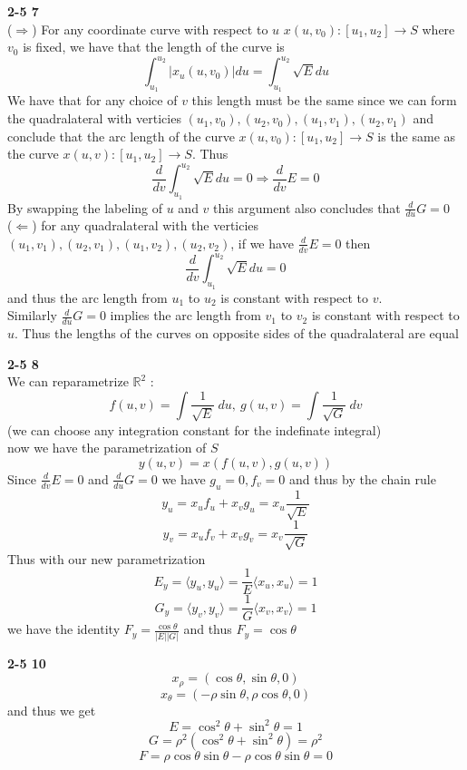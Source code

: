\documentclass[12pt]{article}
\newenvironment{ques}[1]{\textbf{#1}\vspace{1 mm}\\ }{\bigskip}
\theoremstyle{definition}
\renewcommand{\l}{\left }
\renewcommand{\r}{\right }
\newcommand{\R}{\mathbb R}
\renewcommand{\t}{\tau}
\newcommand{\s}{\sin}
\renewcommand{\c}{\cos}
\renewcommand{\t}{\theta}
\begin{document}
\begin{ques}{2-5 7}
	($\Rightarrow$) For any coordinate curve with respect to $u$
	$x(u,v_0):[u_1,u_2] \to S$ where $v_0$ is fixed, we have that the length of
	the curve is
	$$\int_{u_1}^{u_2} \l|x_u(u,v_0)\r| du = \int_{u_1}^{u_2}
	\sqrt E du$$
	We have that for any choice of $v$ this length must be the same since we
	can form the quadralateral with verticies $(u_1,v_0), (u_2,v_0), (u_1,v_1),
	(u_2,v_1)$ and conclude that the arc length of the curve
	$x(u,v_0):[u_1,u_2] \to S$ is the same as the curve $x(u,v):[u_1,u_2] \to
	S$. Thus
	$$\frac d {dv} \int_{u_1}^{u_2} \sqrt E du = 0 \Rightarrow \frac d {dv} E =
	0$$
	By swapping the labeling of $u$ and $v$ this argument also concludes that
	$\frac d {du} G = 0$\\
	($\Leftarrow$) for any quadralateral with the verticies $(u_1,v_1),
	(u_2,v_1), (u_1,v_2), (u_2,v_2)$, if we have $\frac d {dv} E = 0$ then
	$$\frac d {dv} \int_{u_1}^{u_2} \sqrt E du = 0$$
	and thus the arc length from $u_1$ to $u_2$ is constant with respect to $v$.\\
	Similarly $\frac d {du} G = 0$ implies the arc length from $v_1$ to $v_2$
	is constant with respect to $u$. Thus the lengths of the curves on opposite
	sides of the quadralateral are equal
\end{ques}

\begin{ques}{2-5 8}
	We can reparametrize $\R^2$ :
	$$f(u,v) = \int \frac 1 {\sqrt E} \ du,\ g(u,v) = \int \frac 1 { \sqrt G}\
	dv$$
	(we can choose any integration constant for the
	indefinate integral)\\
	now we have the parametrization of $S$
	$$y(u,v) = x(f(u,v), g(u,v))$$
	Since $\frac d {dv} E = 0$ and $\frac d {du} G = 0$ we have $g_u = 0, f_v =
	0$ and thus by the chain rule
	$$y_u = x_u f_u + x_v g_u = x_u \frac 1 {\sqrt E}$$
	$$y_v = x_u f_v + x_v g_v = x_v \frac 1 {\sqrt G}$$
	Thus with our new parametrization
	$$E_y = \langle y_u, y_u \rangle = \frac 1 E \langle x_u, x_u \rangle = 1$$
	$$G_y = \langle y_v, y_v \rangle = \frac 1 G \langle x_v, x_v \rangle = 1$$
	we have the identity $F_y = \frac {\c \t}{|E||G|}$ and thus $F_y = \c \t$
\end{ques}

\begin{ques}{2-5 10}
	$$x_\rho = (\c \t, \s \t, 0)$$
	$$x_\t = (-\rho \s \t, \rho \c \t, 0)$$
	and thus we get
	$$E = \c^2 \t + \s^2 \t = 1$$
	$$G = \rho^2(\c^2 \t + \s^2 \t) = \rho^2$$
	$$F = \rho \c \t \s \t - \rho \c \t \s \t = 0$$
\end{ques}
\end{document}
